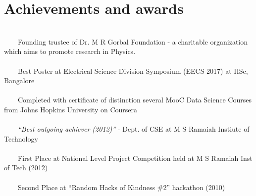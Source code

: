 \documentclass[a4paper,10pt]{article} %
\newcommand{\tabitem}{~~\llap{\textbullet}~~}
\begin{document}

\section{Achievements and awards}
~\\
\tabitem Founding trustee of Dr. M R Gorbal Foundation - a charitable organization which aims to promote research in Physics. \\
~\\
\tabitem Best Poster at Electrical Science Division Symposium (EECS 2017) at IISc, Bangalore \\
\\
\tabitem Completed with certificate of distinction several MooC Data Science Courses from Johns Hopkins University on Coursera\\
\\
\tabitem \textit{``Best outgoing achiever (2012)”} - Dept. of CSE at M S Ramaiah Instiute of Technology \\
\\
\tabitem First Place at National Level Project Competition held at M S Ramaiah Inst of Tech (2012)\\
\\
\tabitem Second Place at “Random Hacks of Kindness \#2” hackathon (2010)\\

\end{document}
